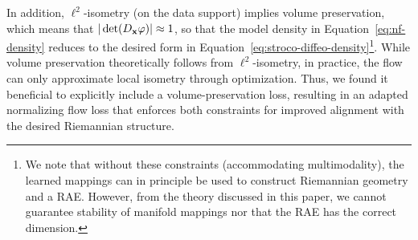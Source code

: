 In addition, $\ell^2$-isometry (on the data support) implies volume preservation, which means that $|\det(D_{\mathbf{x}} \varphi)| \approx 1$, so that the model density in Equation~\ref{eq:nf-density} reduces to the desired form in Equation~\ref{eq:stroco-diffeo-density}\footnote{We note that without these constraints (accommodating multimodality), the learned mappings can in principle be used to construct Riemannian geometry and a RAE. However, from the theory discussed in this paper, we cannot guarantee stability of manifold mappings nor that the RAE has the correct dimension.}. While volume preservation theoretically follows from $\ell^2$-isometry, in practice, the flow can only approximate local isometry through optimization. Thus, we found it beneficial to explicitly include a volume-preservation loss, resulting in an adapted normalizing flow loss that enforces both constraints for improved alignment with the desired Riemannian structure.





